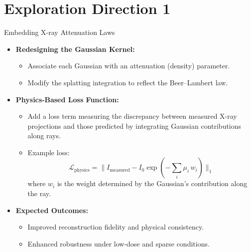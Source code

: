 \documentclass{beamer}
\begin{document}
\section{Exploration Direction 1}
\begin{frame}{Embedding X-ray Attenuation Laws}
    \begin{itemize}
        \item \textbf{Redesigning the Gaussian Kernel:}
        \begin{itemize}
            \item Associate each Gaussian with an attenuation (density) parameter.
            \item Modify the splatting integration to reflect the Beer–Lambert law.
        \end{itemize}
        \item \textbf{Physics-Based Loss Function:}
        \begin{itemize}
            \item Add a loss term measuring the discrepancy between measured X-ray projections and those predicted by integrating Gaussian contributions along rays.
            \item Example loss:
            \[
            \mathcal{L}_{\text{physics}} = \| I_{\text{measured}} - I_0 \exp(-\sum_{i} \mu_i \, w_i) \|_1
            \]
            where \(w_i\) is the weight determined by the Gaussian's contribution along the ray.
        \end{itemize}
        \item \textbf{Expected Outcomes:}
        \begin{itemize}
            \item Improved reconstruction fidelity and physical consistency.
            \item Enhanced robustness under low-dose and sparse conditions.
        \end{itemize}
    \end{itemize}
\end{frame}


\end{document}
